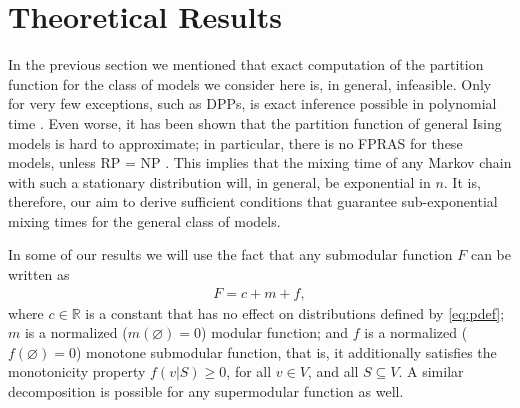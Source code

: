 \section{Theoretical Results}
In the previous section we mentioned that exact computation of the partition function for the class of models we consider here is, in general, infeasible.
Only for very few exceptions, such as DPPs, is exact inference possible in polynomial time \cite{kulesza12}.
Even worse, it has been shown that the partition function of general Ising models is hard to approximate; in particular, there is no FPRAS for these models, unless RP = NP \cite{jerrum93}.
This implies that the mixing time of any Markov chain with such a stationary distribution will, in general, be exponential in $n$.
It is, therefore, our aim to derive sufficient conditions that guarantee sub-exponential mixing times for the general class of models.

In some of our results we will use the fact that any submodular function $F$ can be written as
\begin{align} \label{eq:decomp}
  F = c + m + f,
\end{align}
where $c \in \mathbb{R}$ is a constant that has no effect on distributions defined by \eqref{eq:pdef}; $m$ is a normalized ($m(\varnothing) = 0$) modular function; and $f$ is a normalized ($f(\varnothing) = 0$) monotone submodular function, that is, it additionally satisfies the monotonicity property $f(v|S) \geq 0$, for all $v \in V$, and all $S \subseteq V$.
A similar decomposition is possible for any supermodular function as well.

